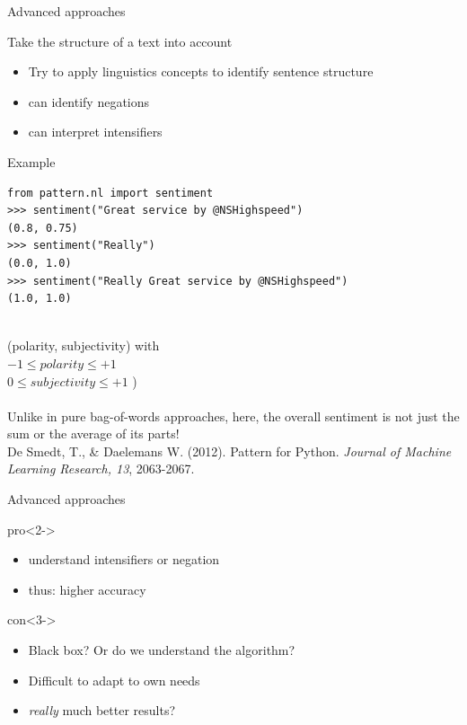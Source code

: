 \documentclass{beamer}
\begin{document}
\begin{frame}{Advanced approaches}
\begin{block}{Take the structure of a text into account}
\begin{itemize}
\item Try to apply linguistics concepts to identify sentence structure
\item can identify negations
\item can interpret intensifiers
\end{itemize}
\end{block}
\end{frame}


\begin{frame}[fragile]{Example}
\begin{lstlisting}
from pattern.nl import sentiment
>>> sentiment("Great service by @NSHighspeed")
(0.8, 0.75)
>>> sentiment("Really")
(0.0, 1.0)
>>> sentiment("Really Great service by @NSHighspeed")
(1.0, 1.0)
\end{lstlisting}
~\\
\footnotesize{(polarity, subjectivity) with \\
 $-1 \leq polarity \leq +1$\\
 $0 \leq subjectivity \leq +1$ )\\} ~ \\
Unlike in pure bag-of-words approaches, here, the overall sentiment is not just the sum or the average of its parts! \\
\tiny{De Smedt, T., \& Daelemans W. (2012).  Pattern for Python. \emph{Journal of Machine Learning Research, 13}, 2063-2067.}
\end{frame}




\begin{frame}{Advanced approaches}
\begin{block}{pro}<2->
\begin{itemize}
\item understand intensifiers or negation
\item thus: higher accuracy
\end{itemize}
\end{block}
\begin{block}{con}<3->
\begin{itemize}
\item Black box? Or do we understand the algorithm?
\item Difficult to adapt to own needs
\item \emph{really} much better results?
\end{itemize}
\end{block}
\end{frame}
\end{document}
